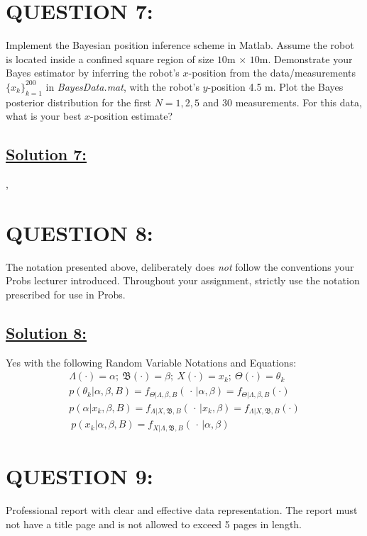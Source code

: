 \documentclass[a4paper,11pt]{article}
\begin{document}
\section{QUESTION 7:}
Implement the Bayesian position inference scheme in Matlab. Assume the robot is
located inside a confined square region of size $10$m $\times$ $10$m. Demonstrate your Bayes
estimator by inferring the robot’s $x$-position from the data/measurements $\{ x_k \}^{200} _{k = 1}$ in \emph{BayesData.mat}, with the robot’s $y$-position 4.5 m. Plot the Bayes posterior distribution for the first $N = 1, 2, 5$ and $30$ measurements. For this data, what is your best $x$-position estimate?

\subsection*{\underline{Solution 7:}}
,

\section{QUESTION 8:}
The notation presented above, deliberately does \emph{not} follow the conventions your Probs
lecturer introduced. Throughout your assignment, strictly use the notation prescribed for
use in Probs.
\subsection*{\underline{Solution 8:}}
\label{sec:notation}
Yes with the following Random Variable Notations and Equations: 
 	\begin{eqnarray}
		\Lambda (\cdot) = \alpha;\: \mathfrak{B}(\cdot) = \beta ; \: X(\cdot) = x_k; \: \Theta ( \cdot) = \theta_k \\		
		p(\theta_k | \alpha, \beta, B) = f_{\Theta | \Lambda, \beta, B}(\, \cdot \, | \alpha, \beta) = f_{\Theta | \Lambda, \beta, B}(\cdot)\\
		p(\alpha | x_k, \beta, B) = f_{\Lambda | X, \mathfrak{B}, B}(\, \cdot \, | x_k, \beta) = f_{\Lambda | X, \mathfrak{B}, B}(\cdot) \\\ 
		p(x_k |\alpha, \beta, B) = f_{X | \Lambda, \mathfrak{B}, B}(\, \cdot \, | \alpha, \beta)
	\end{eqnarray}

\section{QUESTION 9:}
Professional report with clear and effective data representation. The report must not have
a title page and is not allowed to exceed 5 pages in length.
\end{document}
